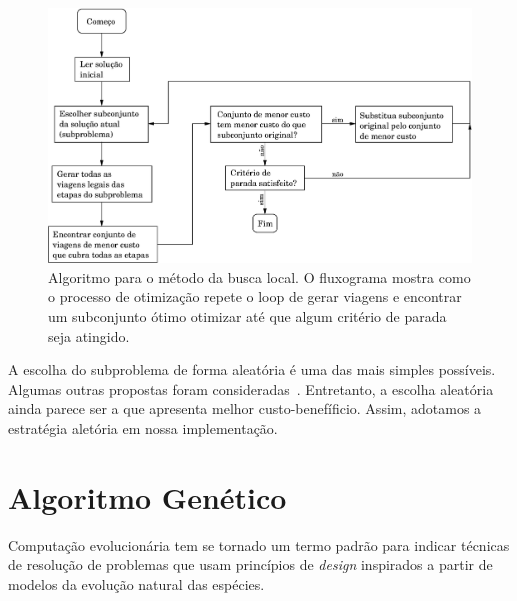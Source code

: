 \begin{figure}[htbp]
	\begin{center}
		\includegraphics[scale=0.6]{fig/localsearch.eps}
		\caption{Algoritmo para o método da busca local. O fluxograma mostra como o processo de 
		otimização repete o loop de gerar viagens e encontrar um subconjunto ótimo otimizar até que
		algum critério de parada seja atingido.}
		\label{fig:busca_local}
	\end{center}
\end{figure}

A escolha do subproblema de forma aleatória é uma das mais simples possíveis. Algumas outras 
propostas foram consideradas~\cite{anbil91a,arabeyre69}. Entretanto, a escolha aleatória ainda
parece ser a que apresenta melhor custo-benefíficio. Assim, adotamos a estratégia aletória em nossa 
implementação.


\section{Algoritmo Genético}
\label{sec:metodos_genetico}

Computação evolucionária tem se tornado um termo padrão para indicar técnicas de resolução de 
problemas que usam princípios de {\it design} inspirados a partir de modelos da evolução natural das
espécies.

